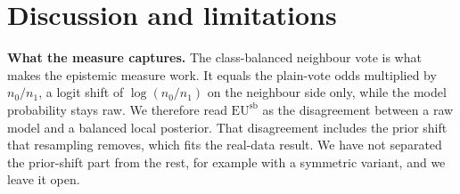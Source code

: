 \documentclass[preprint,12pt]{elsarticle}
\begin{document}
\section{Discussion and limitations}\label{sec:disc}
\textbf{What the measure captures.} The class-balanced neighbour vote is what makes the epistemic measure work. It equals the plain-vote odds multiplied by $n_0/n_1$, a logit shift of $\log(n_0/n_1)$ on the neighbour side only, while the model probability stays raw. We therefore read $\mathrm{EU}^{\mathrm{sb}}$ as the disagreement between a raw model and a balanced local posterior. That disagreement includes the prior shift that resampling removes, which fits the real-data result. We have not separated the prior-shift part from the rest, for example with a symmetric variant, and we leave it open.
\end{document}
